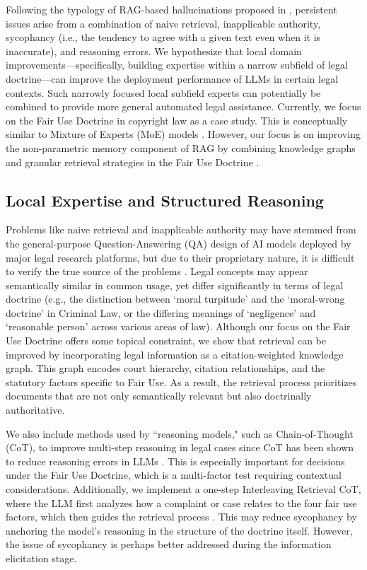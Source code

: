 Following the typology of RAG-based hallucinations proposed in \cite{04b_HallucinationFree}, persistent issues arise from a combination of naive retrieval, inapplicable authority, sycophancy (i.e., the tendency to agree with a given text even when it is inaccurate), and reasoning errors. We hypothesize that local domain improvements—specifically, building expertise within a narrow subfield of legal doctrine—can improve the deployment performance of LLMs in certain legal contexts. Such narrowly focused local subfield experts can potentially be combined to provide more general automated legal assistance. Currently, we focus on the Fair Use Doctrine in copyright law as a case study.  This is conceptually similar to Mixture of Experts (MoE) models \cite{13_AdaptiveMoE}. However, our focus is on improving the non-parametric memory component of RAG by combining knowledge graphs and granular retrieval strategies in the Fair Use Doctrine \cite{23_NonParametricRAGContinualLearning, 01_UnifyingKGwithLLM, 03b_SemanticRepresentationContextual, 02_DenseRetrieval}.

\subsection{Local Expertise and Structured Reasoning}

Problems like naive retrieval and inapplicable authority may have stemmed from the general-purpose Question-Answering (QA) design of AI models deployed by major legal research platforms, but due to their proprietary nature, it is difficult to verify the true source of the problems \cite{04b_HallucinationFree}. Legal concepts may appear semantically similar in common usage, yet differ significantly in terms of legal doctrine (e.g., the distinction between `moral turpitude' and the `moral-wrong doctrine' in Criminal Law, or the differing meanings of `negligence' and `reasonable person' across various areas of law). Although our focus on the Fair Use Doctrine offers some topical constraint, we show that retrieval can be improved by incorporating legal information as a citation-weighted knowledge graph. This graph encodes court hierarchy, citation relationships, and the statutory factors specific to Fair Use. As a result, the retrieval process prioritizes documents that are not only semantically relevant but also doctrinally authoritative.

We also include methods used by ``reasoning models," such as Chain-of-Thought (CoT), to improve multi-step reasoning in legal cases since CoT has been shown to reduce reasoning errors in LLMs \cite{08_CoT}. This is especially important for decisions under the Fair Use Doctrine, which is a multi-factor test requiring contextual considerations. Additionally, we implement a one-step Interleaving Retrieval CoT, where the LLM first analyzes how a complaint or case relates to the four fair use factors, which then guides the retrieval process \cite{28_CoTandIRCoT}. This may reduce sycophancy by anchoring the model’s reasoning in the structure of the doctrine itself. However, the issue of sycophancy is perhaps better addressed during the information elicitation stage.

